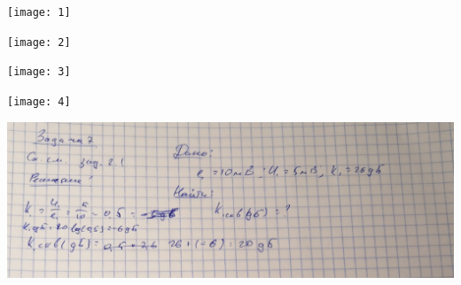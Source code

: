 \documentclass[a4paper,12pt]{article}
\begin{document}
    \begin{center}
        \texttt{[image: 1]}
    \end{center}
    \begin{center}
        \texttt{[image: 2]}
    \end{center}
    \begin{center}
        \texttt{[image: 3]}
    \end{center}
    \begin{center}
        \texttt{[image: 4]}
    \end{center}
    \begin{center}
        \includegraphics[scale=0.2]{5}
    \end{center}
\end{document}
